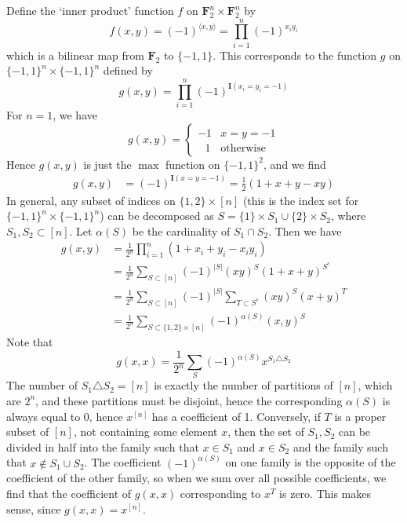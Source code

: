 \begin{example}
    Define the `inner product' function $f$ on $\mathbf{F}_2^n \times \mathbf{F}_2^n$ by
    \[ f(x,y) = (-1)^{\langle x, y \rangle} = \prod_{i = 1}^n (-1)^{x_iy_i} \]
    which is a bilinear map from $\mathbf{F}_2$ to $\{ -1, 1 \}$. This corresponds to the function $g$ on $\{ -1, 1 \}^n \times \{ -1, 1 \}^n$ defined by
    \[ g(x,y) = \prod_{i = 1}^n (-1)^{\mathbf{I}(x_i = y_i = -1)} \]
    For $n = 1$, we have
    \[ g(x,y) = \begin{cases} -1 & x = y = -1 \\ \ \ \ 1 & \text{otherwise} \end{cases} \]
    Hence $g(x,y)$ is just the $\max$ function on $\{ -1, 1 \}^2$, and we find
    \begin{align*}
        g(x,y) &= (-1)^{\mathbf{I}(x = y = -1)} = \frac{1}{2} (1 + x + y - xy)
    \end{align*}
    In general, any subset of indices on $\{ 1, 2 \} \times [n]$ (this is the index set for $\{ -1, 1 \}^n \times \{ -1, 1 \}^n$) can be decomposed as $S = \{ 1 \} \times S_1 \cup \{ 2 \} \times S_2$, where $S_1, S_2 \subset [n]$. Let $\alpha(S)$ be the cardinality of $S_1 \cap S_2$. Then we have
    \begin{align*}
        g(x,y) &= \frac{1}{2^n} \prod_{i = 1}^n (1 + x_i + y_i - x_iy_i)\\
        &= \frac{1}{2^n} \sum_{S \subset [n]} (-1)^{|S|} (xy)^S (1 + x + y)^{S^c}\\
        &= \frac{1}{2^n} \sum_{S \subset [n]} (-1)^{|S|} \sum_{T \subset S^c} (xy)^S (x + y)^T\\
        &= \frac{1}{2^n} \sum_{S \subset \{ 1, 2 \} \times [n]} (-1)^{\alpha(S)} (x,y)^S
    \end{align*}
    Note that
    \[ g(x,x) = \frac{1}{2^n} \sum_S (-1)^{\alpha(S)} x^{S_1 \triangle S_2} \]
    The number of $S_1 \triangle S_2 = [n]$ is exactly the number of partitions of $[n]$, which are $2^n$, and these partitions must be disjoint, hence the corresponding $\alpha(S)$ is always equal to 0, hence $x^{[n]}$ has a coefficient of 1. Conversely, if $T$ is a proper subset of $[n]$, not containing some element $x$, then the set of $S_1,S_2$ can be divided in half into the family such that $x \in S_1$ and $x \in S_2$ and the family such that $x \not \in S_1 \cup S_2$. The coefficient $(-1)^{\alpha(S)}$ on one family is the opposite of the coefficient of the other family, so when we sum over all possible coefficients, we find that the coefficient of $g(x,x)$ corresponding to $x^T$ is zero. This makes sense, since $g(x,x) = x^{[n]}$.
\end{example}

